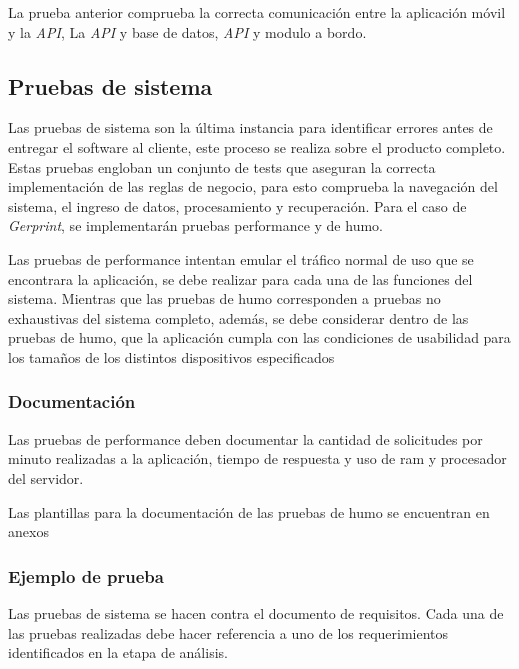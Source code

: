 La prueba anterior comprueba la correcta comunicación entre la aplicación móvil y la \textit{API}, La \textit{API} y base de datos, \textit{API} y modulo a bordo. 

\subsection{Pruebas de sistema}

Las pruebas de sistema son la última instancia para identificar errores antes de entregar el software al cliente, este proceso se realiza sobre el producto completo. Estas pruebas engloban un conjunto de tests que aseguran la correcta implementación de las reglas de negocio, para esto comprueba la navegación del sistema, el ingreso de datos, procesamiento y recuperación. Para el caso de \textit{Gerprint}, se implementarán pruebas performance y de humo.

Las pruebas de performance intentan emular el tráfico normal de uso que se encontrara la aplicación, se debe realizar para cada una de las funciones del sistema. Mientras que las pruebas de humo corresponden a pruebas no exhaustivas del sistema completo, además, se debe considerar dentro de las pruebas de humo, que la aplicación cumpla con las condiciones de usabilidad para los tamaños de los distintos dispositivos especificados 
 

\subsubsection{Documentación}

Las pruebas de performance deben documentar la cantidad de solicitudes por minuto realizadas a la aplicación, tiempo de respuesta y uso de ram y procesador del servidor. 

Las plantillas para la documentación de las pruebas de humo se encuentran en anexos

\subsubsection{Ejemplo de prueba}

Las pruebas de sistema se hacen contra el documento de requisitos. Cada una de las pruebas realizadas debe hacer referencia a uno de los requerimientos identificados en la etapa de análisis.

